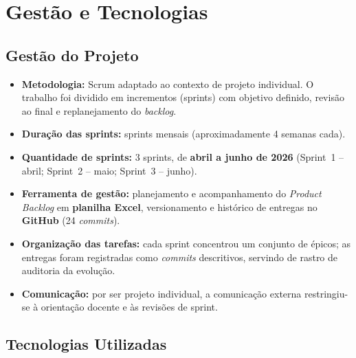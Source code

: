 \documentclass[12pt,a4paper]{article}
\begin{document}
\section{Gest\~ao e Tecnologias}

\subsection{Gest\~ao do Projeto}

\begin{itemize}[nosep]
  \item \textbf{Metodologia:} Scrum adaptado ao contexto de projeto individual.
  O trabalho foi dividido em incrementos (sprints) com objetivo definido, revis\~ao
  ao final e replanejamento do \textit{backlog}.
  \item \textbf{Dura\c{c}\~ao das sprints:} sprints mensais (aproximadamente 4
  semanas cada).
  \item \textbf{Quantidade de sprints:} 3 sprints, de \textbf{abril a junho de
  2026} (Sprint~1 -- abril; Sprint~2 -- maio; Sprint~3 -- junho).
  \item \textbf{Ferramenta de gest\~ao:} planejamento e acompanhamento do
  \textit{Product Backlog} em \textbf{planilha Excel},
  versionamento e hist\'orico de entregas no \textbf{GitHub} (24 \textit{commits}).
  \item \textbf{Organiza\c{c}\~ao das tarefas:} cada sprint concentrou um conjunto
  de \'epicos; as entregas foram registradas como \textit{commits} descritivos,
  servindo de rastro de auditoria da evolu\c{c}\~ao.
  \item \textbf{Comunica\c{c}\~ao:} por ser projeto individual, a comunica\c{c}\~ao
  externa restringiu-se \`a orienta\c{c}\~ao docente e \`as revis\~oes de sprint.
\end{itemize}

\subsection{Tecnologias Utilizadas}
\end{document}
